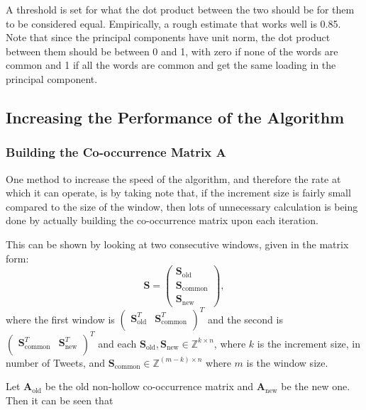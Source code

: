 \documentclass[11pt,a4paper]{article}
\newcommand{\smat}{\mathbf{S}}
\newcommand{\covmat}{\mathbf{A}}
\begin{document}
A threshold is set for what the dot product between the two should be for them to be considered equal. Empirically, a rough estimate that works well is 0.85. Note that since the principal components have unit norm, the dot product between them should be between 0 and 1, with zero if none of the words are common and 1 if all the words are common and get the same loading in the principal component. 
\subsection{Increasing the Performance of the Algorithm}
\subsubsection{Building the Co-occurrence Matrix $\covmat$}
One method to increase the speed of the algorithm, and therefore the rate at which it can operate, is by taking note that, if the increment size is fairly small compared to the size of the window, then lots of unnecessary calculation is being done by actually building the co-occurrence matrix upon each iteration. 

This can be shown by looking at two consecutive windows, given in the matrix form: 
\begin{equation*}
\smat = \left(\begin{matrix}
\smat_{\text{old}}\\
\smat_{\text{common}}\\
\smat_{\text{new}}
\end{matrix}\right),
\end{equation*}
where the first window is $\left(\begin{matrix}
\smat_{\text{old}}^T&
\smat_{\text{common}}^T\\
\end{matrix}\right)^T
$ and the second is $\left(\begin{matrix}
\smat_{\text{common}}^T&
\smat_{\text{new}}^T\\
\end{matrix}\right)^T
$
and each $\smat_{\text{old}}, \smat_{\text{new}} \in \mathbb{Z}^{k \times n}$, where $k$ is the increment size, in number of Tweets, and $\smat_{\text{common}} \in \mathbb{Z}^{(m-k) \times n}$ where $m$ is the window size. 

Let $\covmat_{\text{old}}$ be the old non-hollow co-occurrence matrix and $\covmat_{\text{new}}$ be the new one. Then it can be seen that
\end{document}
